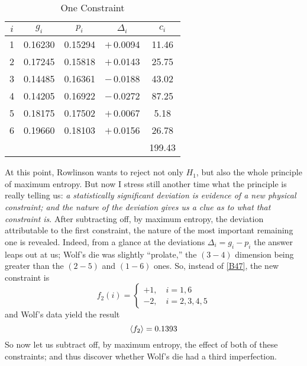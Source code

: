 {\begin{table}[htbp]
	\centering
	{
	\lfstyle
	\begin{tabular}{c c c c c}
		\toprule
		$i$ & $g_i$ & $p_i$ & $\Delta_i$ & $c_i$\\
		\midrule
		1 & 0.16230 & 0.15294 & $+$\,0.0094 & 11.46\\
		2 & 0.17245 & 0.15818 & $+$\,0.0143 & 25.75\\
		3 & 0.14485 & 0.16361 & $-$\,0.0188 & 43.02\\
		4 & 0.14205 & 0.16922 & $-$\,0.0272 & 87.25\\
		5 & 0.18175 & 0.17502 & $+$\,0.0067 & 5.18\\
		6 & 0.19660 & 0.18103 & $+$\,0.0156 & 26.78\\
		\cmidrule{5-5}
		&         &         &         & 199.43\\
		\bottomrule
	\end{tabular}
}
\caption{One Constraint}
\label{tab:1}
\end{table}

At this point, Rowlinson wants to reject not only $H_1$, but also the whole principle of maximum entropy.
But now I stress still another time what the principle is really telling us: \emph{a statistically significant deviation is evidence of a new physical constraint; and the nature of the deviation gives us a clue as to what that constraint is}.
After subtracting off, by maximum entropy, the deviation attributable to the first constraint, the nature of the most important remaining one is revealed.
Indeed, from a glance at the deviations $\Delta_i = g_i - p_i$ the answer leaps out at us; Wolf's die was slightly ``prolate,'' the $(3{-}4)$ dimension being greater than the $(2{-}5)$ and $(1{-}6)$ ones.
So, instead of \eqref{B47}, the new constraint is
\begin{equation}
	\label{B61}
	f_2(i) =
	\begin{cases}
		+1, \quad i = 1, 6\\
		-2, \quad i = 2, 3, 4, 5
	\end{cases}
\end{equation}
and Wolf's data yield the result
\begin{equation}
	\label{B62}
	\langle f_2\rangle = 0.1393
\end{equation}
So now let us subtract off, by maximum entropy, the effect of both of these constraints; and thus discover whether Wolf's die had a third imperfection.

}
